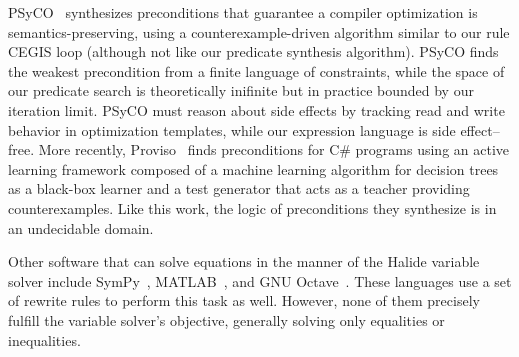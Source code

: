 PSyCO~\citep{lopes2014weakest} synthesizes preconditions that guarantee a compiler optimization is semantics-preserving, using a counterexample-driven algorithm similar to our rule CEGIS loop (although not like our predicate synthesis algorithm). PSyCO finds the weakest precondition from a finite language of constraints, while the space of our predicate search is theoretically inifinite but in practice bounded by our iteration limit. PSyCO must reason about side effects by tracking read and write behavior in optimization templates, while our expression language is side effect--free. More recently, Proviso~\citep{astorga2019learning} finds preconditions for C\# programs using an active learning framework composed of a machine learning algorithm for decision trees as a black-box learner and a test generator that acts as a teacher providing counterexamples. Like this work, the logic of preconditions they synthesize is in an undecidable domain.

Other software that can solve equations in the manner of the Halide variable solver include SymPy~\citep{10.7717/peerj-cs.103}, MATLAB~\citep{higham2016matlab}, and GNU Octave~\citep{eaton1997gnu}. These languages use a set of rewrite rules to perform this task as well. However, none of them precisely fulfill the variable solver's objective, generally solving only equalities or inequalities. 